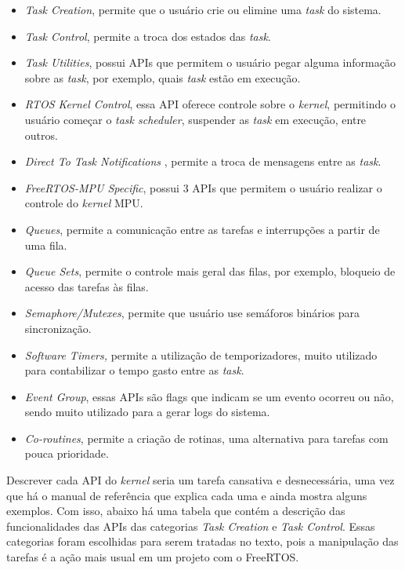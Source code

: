 \begin{itemize}
	\item\textit{Task Creation}, permite que o usuário crie ou elimine uma \textit{task} do sistema.
	\item\textit{Task Control}, permite a troca dos estados das \textit{task}.
	\item\textit{Task Utilities}, possui APIs que permitem o usuário pegar alguma informação sobre as \textit{task}, por exemplo, quais \textit{task} estão em execução.
	\item\textit{RTOS Kernel Control}, essa API oferece controle sobre o \textit{kernel}, permitindo o usuário começar o \textit{task scheduler},  suspender as \textit{task} em execução, entre outros.
	\item\textit{Direct To Task Notifications} , permite a troca de mensagens entre as \textit{task}.
	\item\textit{FreeRTOS-MPU Specific}, possui 3 APIs que permitem o usuário realizar o controle do \textit{kernel} MPU.
	\item\textit{Queues}, permite a comunicação entre as tarefas e interrupções a partir de uma fila.
	\item\textit{Queue Sets}, permite o controle mais geral das filas, por exemplo, bloqueio de acesso das tarefas às filas.
	\item\textit{Semaphore/Mutexes}, permite que usuário use semáforos binários para sincronização.
	\item\textit{Software Timers,} permite a utilização de temporizadores, muito utilizado para contabilizar o tempo gasto entre as \textit{task}.
	\item\textit{Event Group}, essas APIs são flags que indicam se um evento ocorreu ou não, sendo muito utilizado para a gerar logs do sistema.
	\item\textit{Co-routines}, permite a criação de rotinas, uma alternativa para tarefas com pouca prioridade.
\end{itemize}

Descrever cada API do \textit{kernel} seria um tarefa cansativa e desnecessária, uma vez que há o manual de referência que explica cada uma e ainda mostra alguns exemplos. Com isso, abaixo há uma tabela que contém a descrição das funcionalidades das APIs das categorias \textit{Task Creation} e \textit{Task Control}. Essas categorias foram escolhidas para serem tratadas no texto, pois a manipulação das tarefas é a ação mais usual em um projeto com o FreeRTOS.

